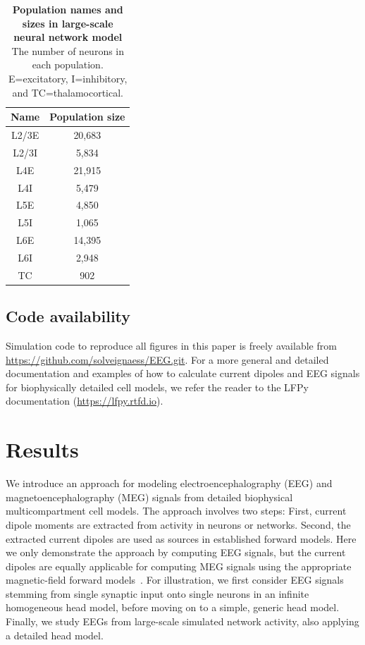 \documentclass[preprint,10pt,authoryear]{elsarticle}
\newcommand{\newtxt}[1]{{\color{Red}#1}}
\begin{document}
\begin{table}[ht]
  \centering
  \begin{tabular}{c|c}
    \hline
    \rule{0pt}{2ex} Name & Population size \\
    \hline
    L2/3E & 20,683\\  
    L2/3I &  5,834\\ \hline
    L4E &  21,915\\ 
    L4I &  5,479\\ \hline
    L5E & 4,850 \\ 
    L5I &  1,065\\ \hline
    L6E &  14,395\\ 
    L6I &  2,948\\ \hline
    TC & 902\\ 
    \hline
  \end{tabular}
  \caption{\newtxt{\textbf{Population names and sizes in large-scale neural network model} The number of neurons in each population. E=excitatory, I=inhibitory, and TC=thalamocortical.}}
  \label{tab:pop_sizes}
\end{table}


\subsection{Code availability}
Simulation code to reproduce all figures in this paper is freely available from \url{https://github.com/solveignaess/EEG.git}.
\newtxt{For a more general and detailed documentation and examples of how to calculate current dipoles and EEG signals for biophysically detailed cell models, we refer the reader to the LFPy documentation (\url{https://lfpy.rtfd.io}).}
\section{Results}\label{sec:results}
\normalsize

We introduce an approach for modeling electroencephalography (EEG) and magnetoencephalography (MEG)
signals from detailed biophysical multicompartment cell models.  The approach involves two steps: First, current dipole moments are extracted from activity
in neurons or networks. Second, the extracted current dipoles are used as sources in established forward models. Here we only demonstrate the approach by computing EEG signals, but the current dipoles are equally applicable for computing MEG signals using the appropriate magnetic-field forward models~\citep{HAMALAINEN1993, HAGEN2018, Ilmoniemi2019}.
For illustration, we first consider EEG signals stemming from single synaptic input onto single neurons in an infinite homogeneous head model, before moving on to a simple, generic head model. Finally, we study EEGs from large-scale simulated network activity, also applying a detailed head model.
\end{document}
